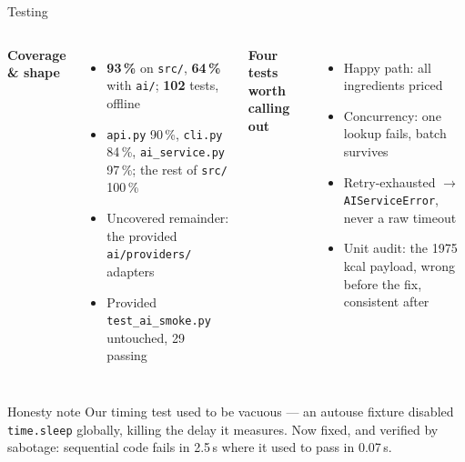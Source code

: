\documentclass[aspectratio=169,11pt]{beamer}
\begin{document}
\begin{frame}{Testing}
  \begin{columns}[T,onlytextwidth]
  \textbf{Coverage \& shape}
  \begin{itemize}\setlength\itemsep{0.3em}
    \item \textbf{93\,\%} on \texttt{src/}, \textbf{64\,\%} with \texttt{ai/}; \textbf{102} tests, offline
    \item \texttt{api.py} 90\,\%, \texttt{cli.py} 84\,\%, \texttt{ai\_service.py} 97\,\%; the rest of \texttt{src/} 100\,\%
    \item Uncovered remainder: the provided \texttt{ai/providers/} adapters
    \item Provided \texttt{test\_ai\_smoke.py} untouched, 29 passing
  \end{itemize}

  \textbf{Four tests worth calling out}
  \begin{itemize}\setlength\itemsep{0.25em}\small
    \item Happy path: all ingredients priced
    \item Concurrency: one lookup fails, batch survives
    \item Retry-exhausted $\to$ \texttt{AIServiceError}, never a raw timeout
    \item Unit audit: the 1975\,kcal payload, wrong before the fix, consistent after
  \end{itemize}
  \end{columns}

  \vspace{0.3em}
  \begin{block}{Honesty note}
    \small Our timing test used to be vacuous --- an autouse fixture disabled \texttt{time.sleep} globally, killing the delay it measures. Now fixed, and verified by sabotage: sequential code fails in 2.5\,s where it used to pass in 0.07\,s.
  \end{block}
\end{frame}
\end{document}
